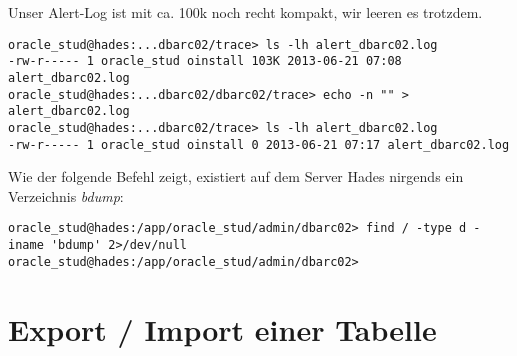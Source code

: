 \documentclass[11pt,a4paper,parskip=half]{scrartcl}
\begin{document}
Unser Alert-Log ist mit ca. 100k noch recht kompakt, wir leeren es trotzdem.
\begin{lstlisting}
oracle_stud@hades:...dbarc02/trace> ls -lh alert_dbarc02.log 
-rw-r----- 1 oracle_stud oinstall 103K 2013-06-21 07:08 alert_dbarc02.log
oracle_stud@hades:...dbarc02/dbarc02/trace> echo -n "" > alert_dbarc02.log 
oracle_stud@hades:...dbarc02/trace> ls -lh alert_dbarc02.log 
-rw-r----- 1 oracle_stud oinstall 0 2013-06-21 07:17 alert_dbarc02.log
\end{lstlisting}

Wie der folgende Befehl zeigt, existiert auf dem Server Hades nirgends ein Verzeichnis \emph{bdump}:
\begin{lstlisting}
oracle_stud@hades:/app/oracle_stud/admin/dbarc02> find / -type d -iname 'bdump' 2>/dev/null 
oracle_stud@hades:/app/oracle_stud/admin/dbarc02>
\end{lstlisting}


\section{Export / Import einer Tabelle}
\end{document}
